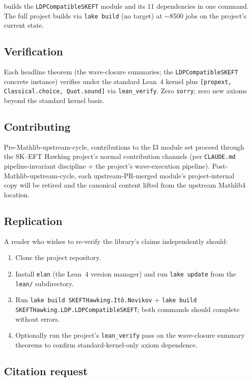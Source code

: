\documentclass[11pt]{article}
\begin{document}
builds the \texttt{LDPCompatibleSKEFT} module and its 11 dependencies
in one command. The full project builds via \texttt{lake build} (no
target) at $\sim$8500 jobs on the project's current state.

\subsection{Verification}

Each headline theorem (the wave-closure summaries; the
\texttt{LDPCompatibleSKEFT} concrete instance) verifies under the
standard Lean~4 kernel plus
\texttt{[propext, Classical.choice, Quot.sound]} via
\texttt{lean\_verify}. Zero \texttt{sorry}; zero new axioms beyond
the standard kernel basis.

\subsection{Contributing}

Pre-Mathlib-upstream-cycle, contributions to the I3 module set
proceed through the SK--EFT Hawking project's normal contribution
channels (per \texttt{CLAUDE.md} pipeline-invariant discipline + the
project's wave-execution pipeline). Post-Mathlib-upstream-cycle, each
upstream-PR-merged module's project-internal copy will be retired and
the canonical content lifted from the upstream Mathlib4 location.

\subsection{Replication}

A reader who wishes to re-verify the library's claims independently
should:
\begin{enumerate}
\item Clone the project repository.
\item Install \texttt{elan} (the Lean~4 version manager) and run
  \texttt{lake update} from the \texttt{lean/} subdirectory.
\item Run \texttt{lake build SKEFTHawking.Itô.Novikov} +
  \texttt{lake build SKEFTHawking.LDP.LDPCompatibleSKEFT}; both
  commands should complete without errors.
\item Optionally run the project's \texttt{lean\_verify} pass on
  the wave-closure summary theorems to confirm standard-kernel-only
  axiom dependence.
\end{enumerate}

\subsection{Citation request}
\end{document}
